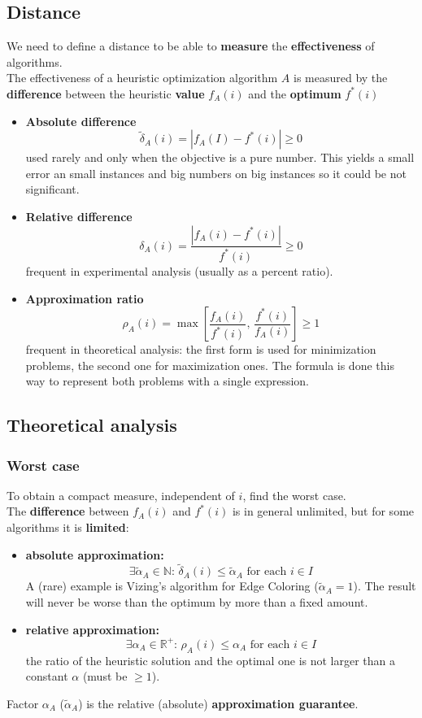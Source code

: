\subsection{Distance} 
We need to define a distance to be able to \textbf{measure} the \textbf{effectiveness} of algorithms.\\
The effectiveness of a heuristic optimization algorithm $A$ is measured by the \textbf{difference} between the heuristic \textbf{value} $f_A (i)$ and the \textbf{optimum} $f^\ast (i)$
\begin{itemize}
	\item \textbf{Absolute difference}
	$$ \tilde{\delta}_A (i) = |f_A(I) - f^\ast (i)| \geq 0 $$
	used rarely and only when the objective is a pure number. This yields a small error an small instances and big numbers on big instances so it could be not significant.\\
	\item \textbf{Relative difference}
	$$ \delta_A (i) = \frac{|f_A (i) - f^\ast (i)|}{f^\ast (i)} \geq 0$$
	frequent in experimental analysis (usually as a percent ratio).\\
	\item \textbf{Approximation ratio}
	$$ \rho_A (i) = \max \left[\frac{f_A(i)}{f^\ast(i)}, \, \frac{f^\ast (i)}{f_A (i)}\right] \geq 1 $$
	frequent in theoretical analysis: the first form is used for minimization problems, the second one for maximization ones. The formula is done this way to represent both problems with a single expression.\\
\end{itemize}

\newpage

\subsection{Theoretical analysis}
\subsubsection{Worst case}
To obtain a compact measure, independent of $i$, find the worst case.\\

The \textbf{difference} between $f_A (i)$ and $f^\ast(i)$ is in general unlimited, but for some algorithms it is \textbf{limited}:
\begin{itemize}
	\item \textbf{absolute approximation:}
	$$ \exists \tilde{\alpha}_A \in \mathbb{N} : \, \tilde{\delta}_A (i) \leq \tilde{\alpha}_A \text{ for each } i \in I $$
	A (rare) example is Vizing's algorithm for Edge Coloring ($\tilde{\alpha}_A = 1$). The result will never be worse than the optimum by more than a fixed amount.
	\item \textbf{relative approximation:}
	$$ \exists \alpha_A \in \mathbb{R}^+ : \, \rho_A (i) \leq \alpha_A \text{ for each } i \in I $$
	the ratio of the heuristic solution and the optimal one is not larger than a constant $\alpha$ (must be $\geq 1$).
\end{itemize}
Factor $\alpha_A$ ($\tilde{\alpha}_A$) is the relative (absolute) \textbf{approximation guarantee}.\\

